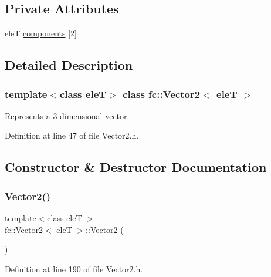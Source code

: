 \subsection*{Private Attributes}
\begin{DoxyCompactItemize}
\item 
eleT \hyperlink{classfc_1_1Vector2_a71ab6c0b3889a5d50dc193cd43aa3334}{components} \mbox{[}2\mbox{]}
\end{DoxyCompactItemize}


\subsection{Detailed Description}
\subsubsection*{template$<$class eleT$>$\newline
class fc\+::\+Vector2$<$ ele\+T $>$}

Represents a 3-\/dimensional vector. 

Definition at line 47 of file Vector2.\+h.



\subsection{Constructor \& Destructor Documentation}
\mbox{\label{classfc_1_1Vector2_ad30b8f86b3f06ad37bbdd969e0e95e51}} 
\subsubsection{\texorpdfstring{Vector2()}{Vector2()}\hspace{0.1cm}{\footnotesize\ttfamily [1/3]}}
{\footnotesize\ttfamily template$<$class eleT $>$ \\
\hyperlink{classfc_1_1Vector2}{fc\+::\+Vector2}$<$ eleT $>$\+::\hyperlink{classfc_1_1Vector2}{Vector2} (\begin{DoxyParamCaption}{ }\end{DoxyParamCaption})}



Definition at line 190 of file Vector2.\+h.

\mbox{\label{classfc_1_1Vector2_a10c728791bce724586901ddb73038858}} 
